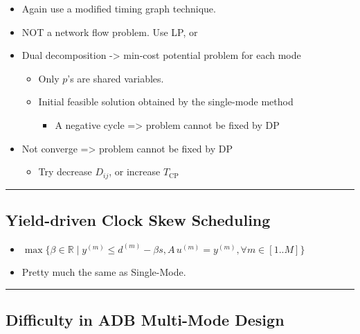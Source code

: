 \documentclass[
]{article}
\providecommand{\tightlist}{%
  \setlength{\itemsep}{0pt}\setlength{\parskip}{0pt}}
\begin{document}
\begin{itemize}
\tightlist
\item
  Again use a modified timing graph technique.
\item
  NOT a network flow problem. Use LP, or
\item
  Dual decomposition -\textgreater{} min-cost potential problem for each mode

  \begin{itemize}
  \tightlist
  \item
    Only \(p\)'s are shared variables.
  \item
    Initial feasible solution obtained by the single-mode method

    \begin{itemize}
    \tightlist
    \item
      A negative cycle =\textgreater{} problem cannot be fixed by DP
    \end{itemize}
  \end{itemize}
\item
  Not converge =\textgreater{} problem cannot be fixed by DP

  \begin{itemize}
  \tightlist
  \item
    Try decrease \(D_{ij}\), or increase \(T_\text{CP}\)
  \end{itemize}
\end{itemize}

\begin{center}\rule{0.5\linewidth}{0.5pt}\end{center}

\subsection{Yield-driven Clock Skew Scheduling}\label{yield-driven-clock-skew-scheduling-2}

\begin{itemize}
\tightlist
\item
  \(\max\{\beta \in \mathbb{R} \mid y^{(m)} \leq d^{(m)} - \beta s, A\,u^{(m)} = y^{(m)}, \forall m\in[1..M]\}\)
\item
  Pretty much the same as Single-Mode.
\end{itemize}

\begin{center}\rule{0.5\linewidth}{0.5pt}\end{center}

\subsection{Difficulty in ADB Multi-Mode Design}\label{difficulty-in-adb-multi-mode-design}
\end{document}
